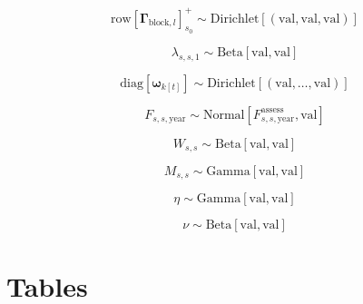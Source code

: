 \documentclass{article}
\begin{document}
\begin{equation}
  \label{eq:prior-movement}
  \mathrm{row} \! \left[ \boldsymbol{\Gamma}_{\mathrm{block},l} \right]^{+}_{s_0} \sim
    \mathrm{Dirichlet} \! \left[ \left( \mathrm{val,val,val}  \right)  \right]
\end{equation}  

\begin{equation}
  \label{eq:prior-selectivity}
  \lambda_{s,s,1} \sim \mathrm{Beta} \! \left[ \mathrm{val, val} \right]
\end{equation}

\begin{equation}
  \label{eq:prior-weight}
  \mathrm{diag} \! \left[ \boldsymbol{\omega}_{k[t]} \right] \sim 
    \mathrm{Dirichlet} \! \left[ \left(  \mathrm{val,\ldots,val} \right) \right]
\end{equation}

\begin{equation}
  \label{eq:prior-fishing}
  F_{s,s,\mathrm{year}} \sim 
    \mathrm{Normal} \! \left[ F^{\mathrm{assess}}_{s,s,\mathrm{year}} \mathrm{, val} \right]
\end{equation}

\begin{equation}
  \label{eq:prior-reporting}
  W_{s,s} \sim \mathrm{Beta} \! \left[ \mathrm{val, val} \right]
\end{equation}

\begin{equation}
  \label{eq:prior-mortality}
  M_{s,s}  \sim \mathrm{Gamma} \! \left[ \mathrm{val, val} \right]
\end{equation}

\begin{equation}
  \label{eq:prior-tagloss}
  \eta \sim \mathrm{Gamma} \! \left[ \mathrm{val, val} \right]
\end{equation}

\begin{equation}
  \label{eq:prior-initloss}
  \nu \sim \mathrm{Beta} \! \left[ \mathrm{val, val}  \right]
\end{equation}

\newpage
\section{Tables}
\end{document}
